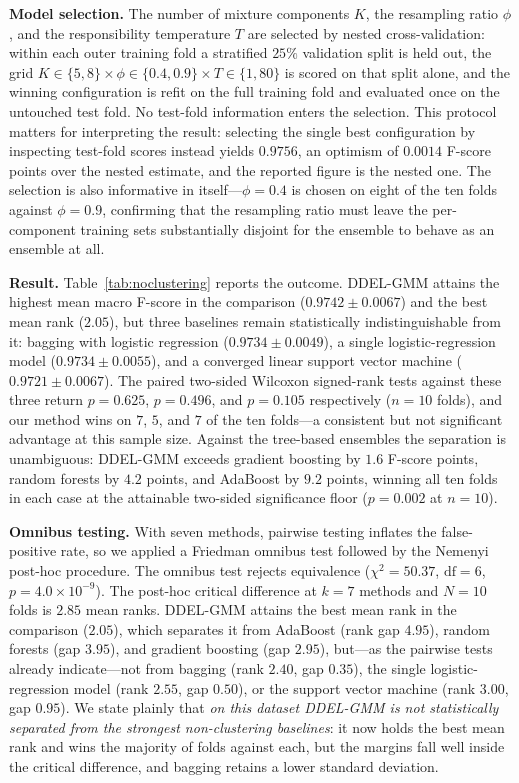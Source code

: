 \documentclass[lettersize,journal]{IEEEtran}
\begin{document}
{{{		\noindent \textbf{Model selection.} The number of mixture components $K$, the resampling ratio $\phi$, and the responsibility temperature $T$ are selected by nested cross-validation: within each outer training fold a stratified $25\%$ validation split is held out, the grid $K \in \{5,8\} \times \phi \in \{0.4,0.9\} \times T \in \{1,80\}$ is scored on that split alone, and the winning configuration is refit on the full training fold and evaluated once on the untouched test fold. No test-fold information enters the selection. This protocol matters for interpreting the result: selecting the single best configuration by inspecting test-fold scores instead yields $0.9756$, an optimism of $0.0014$ F-score points over the nested estimate, and the reported figure is the nested one. The selection is also informative in itself---$\phi = 0.4$ is chosen on eight of the ten folds against $\phi = 0.9$, confirming that the resampling ratio must leave the per-component training sets substantially disjoint for the ensemble to behave as an ensemble at all.
		
		\noindent \textbf{Result.} Table~\ref{tab:noclustering} reports the outcome. DDEL-GMM attains the highest mean macro F-score in the comparison ($0.9742 \pm 0.0067$) and the best mean rank ($2.05$), but three baselines remain statistically indistinguishable from it: bagging with logistic regression ($0.9734 \pm 0.0049$), a single logistic-regression model ($0.9734 \pm 0.0055$), and a converged linear support vector machine ($0.9721 \pm 0.0067$). The paired two-sided Wilcoxon signed-rank tests against these three return $p = 0.625$, $p = 0.496$, and $p = 0.105$ respectively ($n = 10$ folds), and our method wins on $7$, $5$, and $7$ of the ten folds---a consistent but not significant advantage at this sample size. Against the tree-based ensembles the separation is unambiguous: DDEL-GMM exceeds gradient boosting by $1.6$ F-score points, random forests by $4.2$ points, and AdaBoost by $9.2$ points, winning all ten folds in each case at the attainable two-sided significance floor ($p = 0.002$ at $n = 10$).
		
		\noindent \textbf{Omnibus testing.} With seven methods, pairwise testing inflates the false-positive rate, so we applied a Friedman omnibus test followed by the Nemenyi post-hoc procedure. The omnibus test rejects equivalence ($\chi^2 = 50.37$, $\mathrm{df} = 6$, $p = 4.0 \times 10^{-9}$). The post-hoc critical difference at $k = 7$ methods and $N = 10$ folds is $2.85$ mean ranks. DDEL-GMM attains the best mean rank in the comparison ($2.05$), which separates it from AdaBoost (rank gap $4.95$), random forests (gap $3.95$), and gradient boosting (gap $2.95$), but---as the pairwise tests already indicate---not from bagging (rank $2.40$, gap $0.35$), the single logistic-regression model (rank $2.55$, gap $0.50$), or the support vector machine (rank $3.00$, gap $0.95$). We state plainly that \emph{on this dataset DDEL-GMM is not statistically separated from the strongest non-clustering baselines}: it now holds the best mean rank and wins the majority of folds against each, but the margins fall well inside the critical difference, and bagging retains a lower standard deviation.
		
}}}
\end{document}
